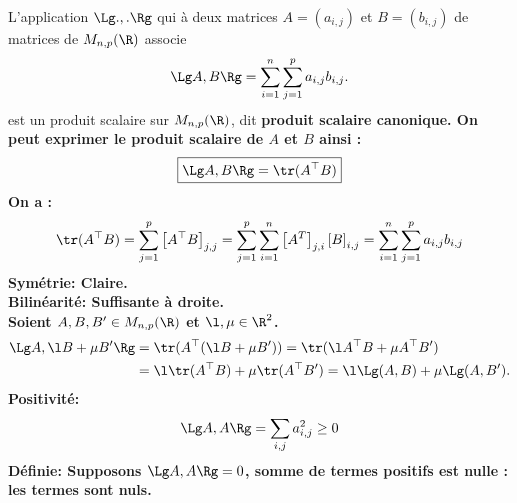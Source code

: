 \documentclass[11pt]{article}
\begin{document}
\begin{prop}{}{}
    L'application $\Lg ., . \Rg$ qui à deux matrices $A=(a_{i,j})$ et $B=(b_{i,j})$ de matrices de $M_{n,p}(\R)$ associe
    \begin{equation*}
        \Lg A, B \Rg = \sum_{i=1}^n\sum_{j=1}^pa_{i,j}b_{i,j}.
    \end{equation*}
    est un produit scalaire sur $M_{n,p}(\R)$, dit \bf{produit scalaire canonique.}\n
    On peut exprimer le produit scalaire de $A$ et $B$ ainsi :
    \begin{equation*}
        \boxed{\Lg A, B \Rg = \tr(A^\top B)}
    \end{equation*}
    \tcblower
    On a :
    \begin{equation*}
        \tr(A^\top B) = \sum_{j=1}^p\left[ A^\top B \right]_{j,j} = \sum_{j=1}^p\sum_{i=1}^n\left[ A^T \right]_{j,i}\left[ B \right]_{i,j} = \sum_{i=1}^n\sum_{j=1}^pa_{i,j}b_{i,j}
    \end{equation*}
    \bf{Symétrie:} Claire.\\
    \bf{Bilinéarité:} Suffisante à droite.\\
    Soient $A,B,B'\in M_{n,p}(\R)$ et $\l,\mu\in\R^2$.
    \begin{align*}
        \Lg A, \l B + \mu B' \Rg &= \tr(A^\top(\l B + \mu B')) = \tr(\l A^\top B + \mu A^\top B')\\
        &= \l\tr(A^\top B) + \mu\tr(A^\top B')=\l\Lg(A,B)+\mu\Lg(A,B').
    \end{align*}
    \bf{Positivité:}
    \begin{equation*}
        \Lg A, A \Rg = \sum_{i,j}a_{i,j}^2\geq0
    \end{equation*}
    \bf{Définie:} Supposons $\Lg A,A \Rg = 0$, somme de termes positifs est nulle : les termes sont nuls.
\end{prop}
\end{document}
